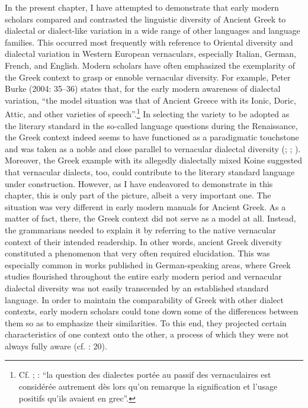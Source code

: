 In the present chapter, I have attempted to demonstrate that early modern scholars compared and contrasted the linguistic diversity of Ancient Greek to dialectal or dialect-like variation in a wide range of other languages and language families. This occurred most frequently with reference to Oriental diversity and dialectal variation in Western European vernaculars, especially Italian, German, French, and English. Modern scholars have often emphasized the exemplarity of the Greek context to grasp or ennoble vernacular diversity. For example, Peter Burke (2004: 35–36) states that, for the early modern awareness of dialectal variation, “the model situation was that of Ancient Greece with its Ionic, Doric, Attic, and other varieties of speech”.\footnote{Cf. \citet[923]{Haugen1966}; \citet[216]{Giard1992}: “la question des dialectes portée au passif des vernaculaires est considérée autrement dès lors qu’on remarque la signification et l’usage positifs qu’ils avaient en grec”.} In selecting the variety to be adopted as the literary standard in the so-called language questions during the Renaissance, the Greek context indeed seems to have functioned as a paradigmatic touchstone and was taken as a noble and close parallel to vernacular dialectal diversity (\citealt{Alinei1984}; \citealt{Trovato1984}; \citealt{Trapp1990}). Moreover, the Greek example with its allegedly dialectally mixed Koine suggested that vernacular dialects, too, could contribute to the literary standard language under construction. However, as I have endeavored to demonstrate in this chapter, this is only part of the picture, albeit a very important one. The situation was very different in early modern manuals for Ancient Greek. As a matter of fact, there, the Greek context did not serve as a model at all. Instead, the grammarians needed to explain it by referring to the native vernacular context of their intended readership. In other words, ancient Greek diversity constituted a phenomenon that very often required elucidation. This was especially common in works published in German-speaking areas, where Greek studies flourished throughout the entire early modern period and vernacular dialectal diversity was not easily transcended by an established standard language. In order to maintain the comparability of Greek with other dialect contexts, early modern scholars could tone down some of the differences between them so as to emphasize their similarities. To this end, they projected certain characteristics of one context onto the other, a process of which they were not always fully aware (cf. \citealt{Alinei1980}: 20).

